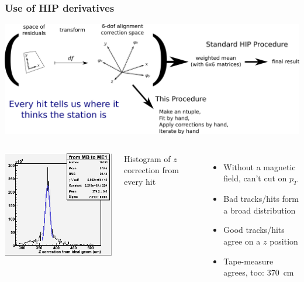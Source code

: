 \documentclass[compress]{beamer}
\begin{document}
\begin{frame}
\frametitle{Use of HIP derivatives}
\small

\includegraphics[width=\linewidth]{transformation.png}

\begin{columns}
\includegraphics[width=\linewidth]{hist_0and1.png}

Histogram of $z$ correction from every hit

\begin{itemize}
\item Without a magnetic field, can't cut on $p_T$
\item Bad tracks/hits form a broad distribution
\item Good tracks/hits agree on a $z$ position
\item Tape-measure agrees, too: 370~cm
\end{itemize}
\end{columns}
\end{frame}
\end{document}
